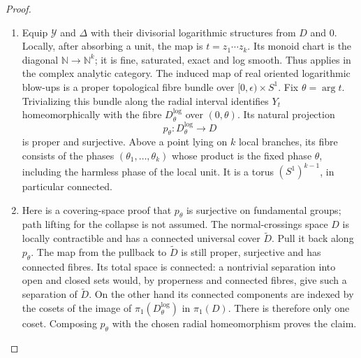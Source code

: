 \begin{proof}
\begin{enumerate}[label=\arabic*.,leftmargin=*]
\item Equip $\mathcal Y$ and $\Delta$ with
their divisorial logarithmic structures
from $D$ and $0$. Locally, after
absorbing a unit, the map is
$t=z_1\cdots z_k$. Its monoid chart
is the diagonal
$\mathbb N\to\mathbb N^k$; it is
fine, saturated, exact and log smooth.
Thus \cite[Theorem 5.1, p.2226]{NO10}
applies in the complex analytic
category. The induced map of real
oriented logarithmic blow-ups is a
proper topological fibre bundle over
$[0,\epsilon)\times S^1$.
Fix $\theta=\arg t$. Trivializing
this bundle along the radial interval
identifies $Y_t$ homeomorphically with
the fibre $D^{\log}_\theta$ over
$(0,\theta)$. Its natural projection
\[
 p_\theta:D^{\log}_\theta\longrightarrow D
\]
is proper and surjective. Above a
point lying on $k$ local branches,
its fibre consists of the phases
$(\theta_1,\ldots,\theta_k)$ whose
product is the fixed phase $\theta$,
including the harmless phase of the
local unit. It is a torus
$(S^1)^{k-1}$, in particular connected.

\item Here is a covering-space proof that
$p_\theta$ is surjective on fundamental
groups; path lifting for the collapse
is not assumed. The normal-crossings
space $D$ is locally contractible
and has a connected universal cover
$\widetilde D$. Pull it back along
$p_\theta$. The map from the pullback
to $\widetilde D$ is still proper,
surjective and has connected fibres.
Its total space is connected: a
nontrivial separation into open and
closed sets would, by properness and
connected fibres, give such a
separation of $\widetilde D$.
On the other hand its connected
components are indexed by the cosets
of the image of
$\pi_1(D^{\log}_\theta)$ in $\pi_1(D)$.
There is therefore only one coset.
Composing $p_\theta$ with the chosen
radial homeomorphism proves the claim.


\end{enumerate}
\end{proof}
